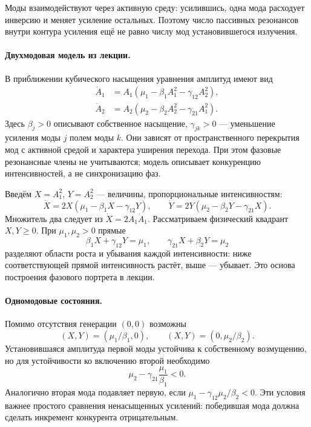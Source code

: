 Моды взаимодействуют через активную среду: усилившись, одна мода расходует инверсию и меняет усиление остальных. Поэтому число пассивных резонансов внутри контура усиления ещё не равно числу мод установившегося излучения.

\paragraph{Двухмодовая модель из лекции.}
В приближении кубического насыщения уравнения амплитуд имеют вид
\begin{equation}
 \begin{aligned}
 \dot A_1&=A_1(\mu_1-\beta_1A_1^2-\gamma_{12}A_2^2),\\
 \dot A_2&=A_2(\mu_2-\beta_2A_2^2-\gamma_{21}A_1^2).
 \end{aligned}
\end{equation}
Здесь $\beta_j>0$ описывают собственное насыщение, $\gamma_{jk}>0$ --- уменьшение усиления моды $j$ полем моды $k$. Они зависят от пространственного перекрытия мод с активной средой и характера уширения перехода. При этом фазовые резонансные члены не учитываются; модель описывает конкуренцию интенсивностей, а не синхронизацию фаз.

Введём $X=A_1^2$, $Y=A_2^2$ --- величины, пропорциональные интенсивностям:
\begin{equation}\label{eq:laserTwoModes}
 \dot X=2X(\mu_1-\beta_1X-\gamma_{12}Y),\qquad
 \dot Y=2Y(\mu_2-\beta_2Y-\gamma_{21}X).
\end{equation}
Множитель два следует из $\dot X=2A_1\dot A_1$. Рассматриваем физический квадрант $X,Y\geq0$. При $\mu_1,\mu_2>0$ прямые
\begin{equation}
 \beta_1X+\gamma_{12}Y=\mu_1,\qquad
 \gamma_{21}X+\beta_2Y=\mu_2
\end{equation}
разделяют области роста и убывания каждой интенсивности: ниже соответствующей прямой интенсивность растёт, выше --- убывает. Это основа построения фазового портрета в лекции.

\paragraph{Одномодовые состояния.}
Помимо отсутствия генерации $(0,0)$ возможны
\[
 (X,Y)=(\mu_1/\beta_1,0),\qquad
 (X,Y)=(0,\mu_2/\beta_2).
\]
Установившаяся амплитуда первой моды устойчива к собственному возмущению, но для устойчивости ко включению второй необходимо
\begin{equation}
 \mu_2-\gamma_{21}\frac{\mu_1}{\beta_1}<0.
\end{equation}
Аналогично вторая мода подавляет первую, если $\mu_1-\gamma_{12}\mu_2/\beta_2<0$. Эти условия важнее простого сравнения ненасыщенных усилений: победившая мода должна сделать инкремент конкурента отрицательным.

